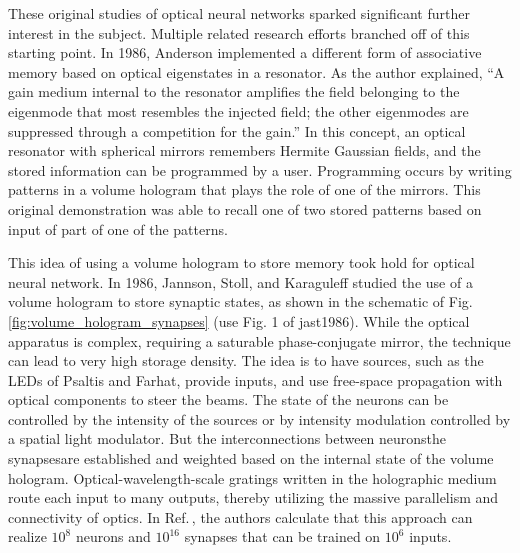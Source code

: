 These original studies of optical neural networks sparked significant further interest in the subject. Multiple related research efforts branched off of this starting point. In 1986, Anderson implemented a different form of associative memory \cite{an1986} based on optical eigenstates in a resonator. As the author explained, ``A gain medium internal to the resonator amplifies the field belonging to the eigenmode that most resembles the injected field; the other eigenmodes are suppressed through a competition for the gain.'' In this concept, an optical resonator with spherical mirrors remembers Hermite Gaussian fields, and the stored information can be programmed by a user. Programming occurs by writing patterns in a volume hologram that plays the role of one of the mirrors. This original demonstration was able to recall one of two stored patterns based on input of part of one of the patterns.

This idea of using a volume hologram to store memory took hold for optical neural network. In 1986, Jannson, Stoll, and Karaguleff studied the use of a volume hologram to store synaptic states, as shown in the schematic of Fig.\,\ref{fig:volume_hologram_synapses} (use Fig. 1 of jast1986). While the optical apparatus is complex, requiring a saturable phase-conjugate mirror, the technique can lead to very high storage density. The idea is to have sources, such as the LEDs of Psaltis and Farhat, provide inputs, and use free-space propagation with optical components to steer the beams. The state of the neurons can be controlled by the intensity of the sources or by intensity modulation controlled by a spatial light modulator. But the interconnections between neurons\textemdash the synapses\textemdash are established and weighted based on the internal state of the volume hologram. Optical-wavelength-scale gratings written in the holographic medium route each input to many outputs, thereby utilizing the massive parallelism and connectivity of optics. In Ref.\,\cite{jast1986}, the authors calculate that this approach can realize $10^8$ neurons and $10^{16}$ synapses that can be trained on $10^6$ inputs. 


